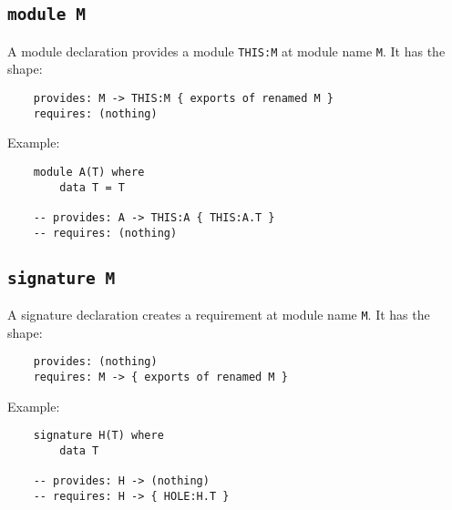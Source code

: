 \documentclass{article}
\begin{document}

\subsection{\texttt{module M}}

A module declaration provides a module \verb|THIS:M| at module name \verb|M|. It
has the shape:

\begin{verbatim}
    provides: M -> THIS:M { exports of renamed M }
    requires: (nothing)
\end{verbatim}
Example:

\begin{verbatim}
    module A(T) where
        data T = T

    -- provides: A -> THIS:A { THIS:A.T }
    -- requires: (nothing)
\end{verbatim}

\newpage
\subsection{\texttt{signature M}}

A signature declaration creates a requirement at module name \verb|M|.  It has the shape:

\begin{verbatim}
    provides: (nothing)
    requires: M -> { exports of renamed M }
\end{verbatim}

\noindent Example:

\begin{verbatim}
    signature H(T) where
        data T

    -- provides: H -> (nothing)
    -- requires: H -> { HOLE:H.T }
\end{verbatim}
\end{document}
